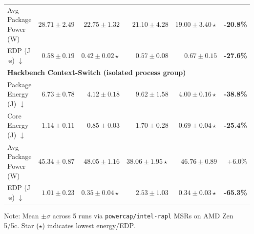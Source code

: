 \documentclass[conference]{IEEEtran}
\begin{document}
\begin{table}[t!]
{\begin{tabular}{lrrrrr}
Avg Package Power (W) & $28.71 \pm 2.49$ & $22.75 \pm 1.32$ & $21.10 \pm 4.28$ & $\mathbf{19.00 \pm 3.40} \star$ & \textbf{-20.8\%} \\
EDP (J$\cdot$s) $\downarrow$ & $0.58 \pm 0.19$ & $\mathbf{0.42 \pm 0.02} \star$ & $0.57 \pm 0.08$ & $0.67 \pm 0.15$ & \textbf{-27.6\%} \\
\midrule
\multicolumn{6}{l}{\textbf{Hackbench Context-Switch (isolated process group)}} \\
Package Energy (J) $\downarrow$ & $6.73 \pm 0.78$ & $4.12 \pm 0.18$ & $9.62 \pm 1.58$ & $\mathbf{4.00 \pm 0.16} \star$ & \textbf{-38.8\%} \\
Core Energy (J) $\downarrow$ & $1.14 \pm 0.11$ & $0.85 \pm 0.03$ & $1.70 \pm 0.28$ & $\mathbf{0.69 \pm 0.04} \star$ & \textbf{-25.4\%} \\
Avg Package Power (W) & $45.34 \pm 0.87$ & $48.05 \pm 1.16$ & $\mathbf{38.06 \pm 1.95} \star$ & $46.76 \pm 0.89$ & +6.0\% \\
EDP (J$\cdot$s) $\downarrow$ & $1.01 \pm 0.23$ & $\mathbf{0.35 \pm 0.04} \star$ & $2.53 \pm 1.03$ & $\mathbf{0.34 \pm 0.03} \star$ & \textbf{-65.3\%} \\
\bottomrule
\end{tabular}%
}
\vspace{0.2ex}
\raggedright \tiny Note: Mean $\pm \sigma$ across 5 runs via \texttt{powercap/intel-rapl} MSRs on AMD Zen 5/5c. Star ($\star$) indicates lowest energy/EDP.
\end{table}
\end{document}
